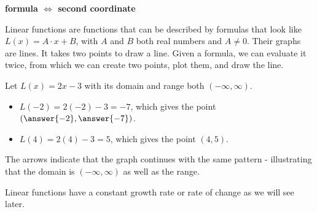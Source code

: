 \documentclass{ximera}
\begin{document}
\begin{center}
\textbf{\textcolor{purple!85!blue}{formula $\iff$ second coordinate}}
\end{center}







\begin{example}

Linear functions are functions that can be described by formulas that look like $L(x) = A \cdot x + B$, with $A$ and $B$ both real numbers and $A \ne 0$.  Their graphs are lines.  It takes two points to draw a line. Given a formula, we can evaluate it twice, from which we can create two points, plot them, and draw the line.

Let $L(x) = 2x-3$ with its domain and range both $(-\infty, \infty)$.

\begin{itemize}
\item $L(-2) = 2(-2) - 3 = -7$, which gives the point $\left(\answer{-2}, \answer{-7}\right)$.
\item $L(4) = 2(4) - 3 = 5$, which gives the point $(4, 5)$.
\end{itemize}






\begin{image}
\end{image}

The arrows indicate that the graph continues with the same pattern - illustrating that the domain is $(-\infty, \infty)$ as well as the range.


\end{example}
Linear functions have a constant growth rate or rate of change as we will see later.  \\
\end{document}
